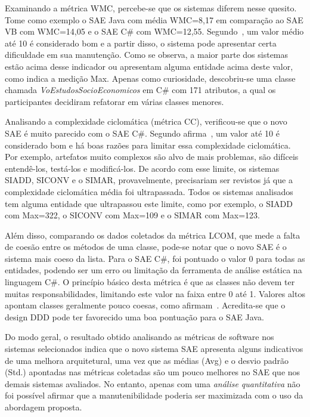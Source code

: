 Examinando a métrica WMC, percebe-se que os sistemas diferem nesse quesito. Tome como exemplo o \acrshort{SAE} Java com média WMC=8,17 em comparação ao \acrshort{SAE} VB com WMC=14,05 e o \acrshort{SAE} C\# com WMC=12,55. Segundo~\cite{chidamber1994metrics}, um valor médio até 10 é considerado bom e a partir disso, o sistema pode apresentar certa dificuldade em sua manutenção. Como se observa, a maior parte dos sistemas estão acima desse indicador ou apresentam alguma entidade acima deste valor, como indica a medição Max. Apenas como curiosidade, descobriu-se uma classe chamada \emph{VoEstudosSocioEconomicos} em C\# com 171 atributos, a qual os participantes decidiram refatorar em várias classes menores.

Analisando a complexidade ciclomática (métrica CC), verificou-se que o novo \acrshort{SAE} é muito parecido com o \acrshort{SAE} C\#. Segundo afirma~\cite{watson1996structured}, um valor até 10 é considerado bom e há boas razões para limitar essa complexidade ciclomática. Por exemplo, artefatos muito complexos são alvo de mais problemas, são difíceis entendê-los, testá-los e modificá-los. De acordo com esse limite, os sistemas \acrshort{SIADD}, \acrshort{SICONV} e o \acrshort{SIMAR}, provavelmente, precisariam ser revistos já que a complexidade ciclomática média foi ultrapassada. Todos os sistemas analisados tem alguma entidade que ultrapassou este limite, como por exemplo, o \acrshort{SIADD} com Max=322, o \acrshort{SICONV} com Max=109 e o \acrshort{SIMAR} com Max=123. 

Além disso, comparando os dados coletados da métrica LCOM, que mede a falta de coesão entre os métodos de uma classe, pode-se notar que o novo \acrshort{SAE} é o sistema mais coeso da lista. Para o \acrshort{SAE} C\#, foi pontuado o valor 0 para todas as entidades, podendo ser um erro ou limitação da ferramenta de análise estática na linguagem C\#. O princípio básico desta métrica é que as classes não devem ter muitas responsabilidades, limitando este valor na faixa entre 0 até 1. Valores altos apontam classes geralmente pouco coesas, como afirmam~\cite{chidamber1994metrics, gyimothy2005empirical}. Acredita-se que o design \acrshort{DDD} pode ter favorecido uma boa pontuação para o \acrshort{SAE} Java.

Do modo geral, o resultado obtido analisando as métricas de software 
nos sistemas selecionados indica que o novo sistema \acrshort{SAE} apresenta alguns
indicativos de uma melhora arquitetural, uma vez que as médias (Avg) e o desvio padrão (Std.) 
apontadas nas métricas coletadas são um pouco melhores no \acrshort{SAE} que nos
demais sistemas avaliados. No entanto, apenas com uma \emph{análise quantitativa}
não foi possível afirmar que a manutenibilidade poderia ser maximizada com 
o uso da abordagem proposta.








